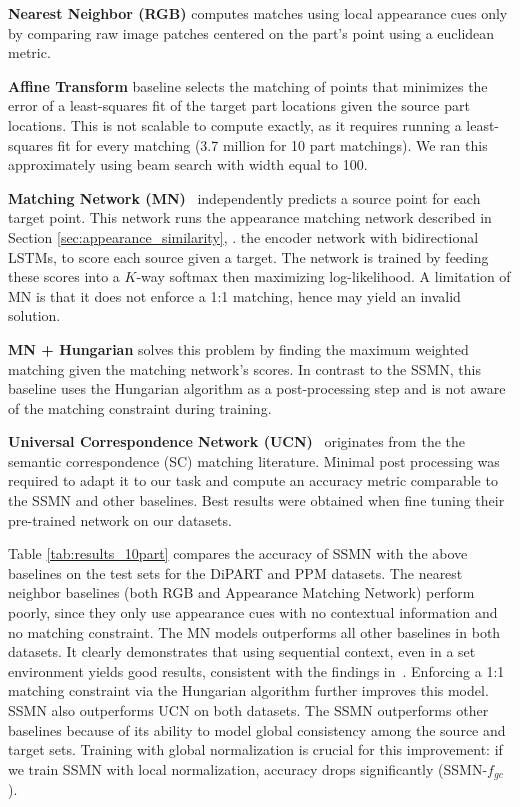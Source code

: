 \documentclass[10pt,twocolumn,letterpaper]{article}
\begin{document}
\noindent\textbf{Nearest Neighbor (RGB)} computes matches using local appearance cues only by comparing raw image patches centered on the part's point using a euclidean metric.

\noindent\textbf{Affine Transform} baseline selects the matching of points that minimizes the error of a least-squares fit of the target part locations given the source part locations. This is not scalable to compute exactly, as it requires running a least-squares fit for every matching (3.7 million for 10 part matchings). We ran this approximately using beam search with width equal to 100.

\noindent\textbf{Matching Network (MN)}~\cite{vinyalsBLKW16} independently predicts a source point for each target point. This network runs the appearance matching network described in Section \ref{sec:appearance_similarity}, \ie. the encoder network with bidirectional LSTMs, to score each source given a target. The network is trained by feeding these scores into a $K$-way softmax then maximizing log-likelihood. A limitation of MN is that it does not enforce a 1:1 matching, hence may yield an invalid solution.

\noindent\textbf{MN + Hungarian} solves this problem by finding the maximum weighted matching given the matching network's scores. In contrast to the SSMN, this baseline uses the Hungarian algorithm as a post-processing step and is not aware of the matching constraint during training.


\noindent\textbf{Universal Correspondence Network (UCN)}~\cite{Choy2016UniversalCN} originates from the the semantic correspondence (SC) matching literature. 
Minimal post processing was required to adapt it to our task and compute an accuracy metric comparable to the SSMN and other baselines. 
Best results were obtained when fine tuning their pre-trained network on our datasets.


Table \ref{tab:results_10part} compares the accuracy of SSMN with the above baselines on the test sets for the DiPART and PPM datasets. The nearest neighbor baselines (both RGB and Appearance Matching Network) perform poorly, since they only use appearance cues with no contextual information and no matching constraint. 
The MN models outperforms all other baselines in both datasets. It clearly demonstrates that using sequential context, even in a set environment yields good results, consistent with the findings in~\cite{vinyalsBLKW16}.
Enforcing a 1:1 matching constraint via the Hungarian algorithm further improves this model. SSMN also outperforms UCN on both datasets. The SSMN outperforms other baselines because of its ability to model global consistency among the source and target sets. Training with global normalization is crucial for this improvement: if we train SSMN with local normalization, accuracy drops significantly (SSMN-$f_{gc}$).
 
\end{document}
